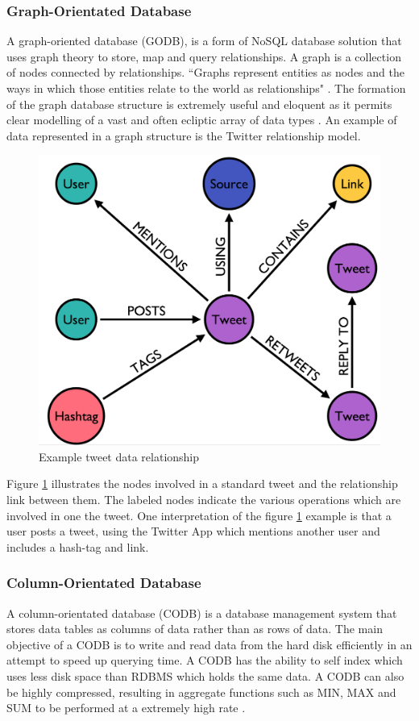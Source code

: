 \subsubsection{Graph-Orientated Database}
A graph-oriented database (GODB), is a form of NoSQL database solution that uses graph theory to store, map and query relationships. A graph is a collection of nodes connected by relationships. ``Graphs represent entities as nodes and the ways in which those entities relate to the world as relationships" \cite{gd}. The formation of the graph database structure is extremely useful and eloquent as it permits clear modelling of a vast and often ecliptic array of data types \cite{gd}. An example of data represented in a graph structure is the Twitter relationship model. \begin{figure}[h]\begin{center}\includegraphics[width=0.5\linewidth]{images/graphdb_twitter}\caption{Example tweet data relationship}\label{fig:twitter}\end{center}\end{figure} Figure \ref{fig:twitter} illustrates the nodes involved in a standard tweet and the relationship link between them. The labeled nodes indicate the various operations which are involved in one the tweet. One interpretation of the figure \ref{fig:twitter} example is that a user posts a tweet, using the Twitter App which mentions another user and includes a hash-tag and link.

\subsubsection{Column-Orientated Database}
A column-orientated database (CODB) is a database management system that stores data tables as columns of data rather than as rows of data. The main objective of a CODB is to write and read data from the hard disk efficiently in an attempt to speed up querying time. A CODB has the ability to self index which uses less disk space than RDBMS which holds the same data. A CODB can also be highly compressed, resulting in aggregate functions such as MIN, MAX and SUM to be performed at a extremely high rate \cite{cd}.

